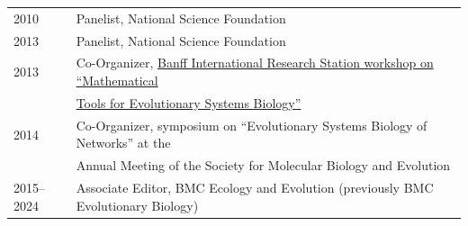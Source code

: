 \documentclass[11pt]{article}
\begin{document}
\begin{longtable}[l]{l l}
2010 & Panelist, National Science Foundation\\%
2013 & Panelist, National Science Foundation\\%
2013 & Co-Organizer, \href{http://www.birs.ca/events/2013/5-day-workshops/13w5080}{Banff International Research Station workshop on ``Mathematical}\\
&\href{http://www.birs.ca/events/2013/5-day-workshops/13w5080}{Tools for Evolutionary Systems Biology''}\\
2014 & Co-Organizer, symposium on ``Evolutionary Systems Biology of Networks'' at the\\
&Annual Meeting of the Society for Molecular Biology and Evolution\\
2015--2024 & Associate Editor, BMC Ecology and Evolution (previously BMC Evolutionary Biology)\\

\end{longtable}
\end{document}
